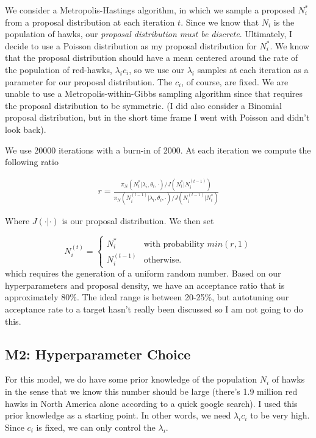 \documentclass{asaproc}
\newcommand{\lami}{\lambda_i}
\newcommand{\theti}{\theta_i}
\newcommand{\ci}{c_i}
\newcommand{\Ni}{N_i}
\begin{document}
We consider a Metropolis-Hastings algorithm, in which we sample a proposed $\Ni^*$ from a proposal distribution at each iteration $t$. Since we know that $\Ni$ is the population of hawks, our \textit{proposal distribution must be discrete}. Ultimately, I decide to use a Poisson distribution as my proposal distribution for $\Ni^*$. We know that the proposal distribution should have a mean centered around the rate of the population of red-hawks, $\lami \ci$, so we use our $\lami$ samples at each iteration as a parameter for our proposal distribution. The $\ci$, of course, are fixed. We are unable to use a Metropolis-within-Gibbs sampling algorithm since that requires the proposal distribution to be symmetric. (I did also consider a Binomial proposal distribution, but in the short time frame I went with Poisson and didn't look back).

We use 20000 iterations with a burn-in of 2000. At each iteration we compute the following ratio

\begin{align*}
    r = \frac{\pi_N(\Ni^*|\lami, \theti, \cdot) / J(\Ni^*|N^{(t-1)}_{i})}{\pi_N(N^{(t-1)}_{i}|\lami, \theti,\cdot)/J(N^{(t-1)}_{i}|\Ni^*)}
\end{align*}

Where $J(\cdot|\cdot)$ is our proposal distribution. We then set

$$ \Ni^{(t)} = \begin{cases} 
      \Ni^* & \text{with probability $min(r,1)$}\\
      N^{(t-1)}_{i} & \text{otherwise.}
   \end{cases}
$$
which requires the generation of a uniform random number. Based on our hyperparameters and proposal density, we have an acceptance ratio that is approximately $80\%$. The ideal range is between 20-25\%, but autotuning our acceptance rate to a target hasn't really been discussed so I am not going to do this.


\subsection{M2: Hyperparameter Choice}
For this model, we do have some prior knowledge of the population $\Ni$ of hawks in the sense that we know this number should be large (there's 1.9 million red hawks in North America alone according to a quick google search). I used this prior knowledge as a starting point. In other words, we need $\lami\ci$ to be very high. Since $\ci$ is fixed, we can only control the $\lami$. 
\end{document}
